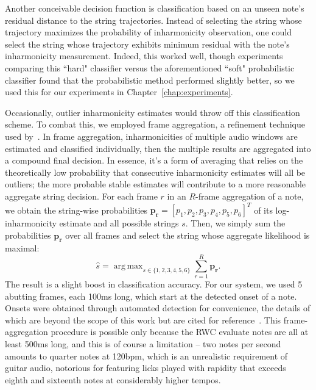\documentclass[12pt]{cmuthesis}
\DeclareMathOperator*{\argmax}{arg\,max}
\begin{document}
Another conceivable decision function is classification based on an unseen note's residual distance to the string trajectories. Instead of selecting the string whose trajectory maximizes the probability of inharmonicity observation, one could select the string whose trajectory exhibits minimum residual with the note's inharmonicity measurement. Indeed, this worked well, though experiments comparing this ``hard" classifier versus the aforementioned ``soft" probabilistic classifier found that the probabilistic method performed slightly better, so we used this for our experiments in Chapter~\ref{chap:experiments}.

Occasionally, outlier inharmonicity estimates would throw off this classification scheme. To combat this, we employed frame aggregation, a refinement technique used by~\cite{abesser2012}. In frame aggregation, inharmonicities of multiple audio windows are estimated and classified individually, then the multiple results are aggregated into a compound final decision. In essence, it's a form of averaging that relies on the theoretically low probability that consecutive inharmonicity estimates will all be outliers; the more probable stable estimates will contribute to a more reasonable aggregate string decision. For each frame $r$ in an $R$-frame aggregation of a note, we obtain the string-wise probabilities $\mathbf{p_r} = [p_1,p_2,p_3,p_4,p_5,p_6]^T$ of its log-inharmonicity estimate and all possible strings $s$. Then, we simply sum the probabilities $\mathbf{p_r}$ over all frames and select the string whose aggregate likelihood is maximal:
\begin{equation}
\hat{s} = \argmax_{s\in\{1,2,3,4,5,6\}}\sum_{r=1}^{R} \mathbf{p_r}.
\end{equation}
The result is a slight boost in classification accuracy. For our system, we used 5 abutting frames, each 100ms long, which start at the detected onset of a note. Onsets were obtained through automated detection for convenience, the details of which are beyond the scope of this work but are cited for reference~\cite{bello2005,dixon2006}. This frame-aggregation procedure is possible only because the RWC evaluate notes are all at least 500ms long, and this is of course a limitation -- two notes per second amounts to quarter notes at 120bpm, which is an unrealistic requirement of guitar audio, notorious for featuring licks played with rapidity that exceeds eighth and sixteenth notes at considerably higher tempos.
\end{document}

